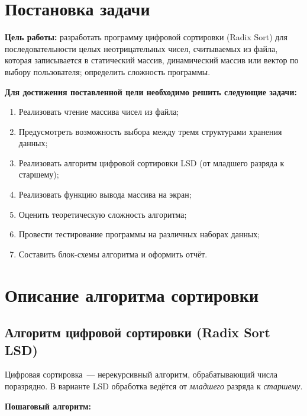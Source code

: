 \documentclass[a4paper,14pt]{extarticle}
\begin{document}
\newpage
\section{Постановка задачи}

\textbf{Цель работы:} разработать программу цифровой сортировки (Radix Sort) для последовательности целых неотрицательных чисел, считываемых из файла, которая записывается в статический массив, динамический массив или вектор по выбору пользователя; определить сложность программы.

\vspace{0.5cm}
\textbf{Для достижения поставленной цели необходимо решить следующие задачи:}
\begin{enumerate}
  \item Реализовать чтение массива чисел из файла;
  \item Предусмотреть возможность выбора между тремя структурами хранения данных;
  \item Реализовать алгоритм цифровой сортировки LSD (от младшего разряда к старшему);
  \item Реализовать функцию вывода массива на экран;
  \item Оценить теоретическую сложность алгоритма;
  \item Провести тестирование программы на различных наборах данных;
  \item Составить блок-схемы алгоритма и оформить отчёт.
\end{enumerate}

\newpage
\section{Описание алгоритма сортировки}

\subsection{Алгоритм цифровой сортировки (Radix Sort LSD)}

Цифровая сортировка~--- нерекурсивный алгоритм, обрабатывающий числа поразрядно. В варианте LSD обработка ведётся от \textit{младшего} разряда к \textit{старшему}.

\textbf{Пошаговый алгоритм:}
\end{document}
